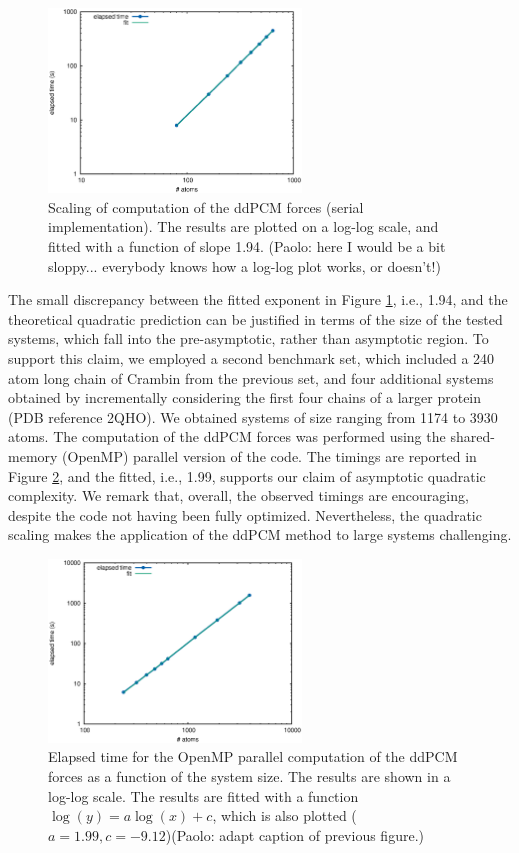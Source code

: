 \begin{figure}[t]
 \caption{Scaling of computation of the ddPCM forces (serial implementation). The results are plotted on a log-log scale, and fitted with a function of slope 1.94. {\color{red}(Paolo: here I would be a bit sloppy... everybody knows how a log-log plot works, or doesn't!) }%
 \label{fig:serial}}
 \includegraphics[width=0.6\textwidth]{figs/serial.eps}
\end{figure}

The small discrepancy between the fitted exponent in Figure \ref{fig:serial}, i.e., 1.94, and the theoretical quadratic prediction can be justified in terms of the size of the tested systems, which fall into the pre-asymptotic, rather than asymptotic region. To support this claim, we employed a second benchmark set, which included a 240 atom long chain of Crambin from the previous set, and four additional systems obtained by incrementally considering the first four chains of a larger protein (PDB reference 2QHO). We obtained systems of size ranging from 1174 to 3930 atoms. The computation of the ddPCM forces was performed using the shared-memory (OpenMP) parallel version of the code. The timings are reported in
Figure \ref{fig:para}, and the fitted, i.e., 1.99, supports our claim of asymptotic quadratic complexity. We remark that, overall, the observed timings are encouraging, despite the code not having been fully optimized. Nevertheless, the quadratic scaling makes the application of the ddPCM method to large systems challenging. 


\begin{figure}[t]
 \caption{Elapsed time for the OpenMP parallel computation of the ddPCM forces as a function of the system size. The results are shown in a log-log scale. The results are fitted with a function $\log (y) = a \log(x) + c$, which is also plotted ($a=1.99, c=-9.12$){\color{red}(Paolo: adapt caption of previous figure.)}\label{fig:para}}
 \includegraphics[width=0.6\textwidth]{figs/para.eps}
\end{figure}


